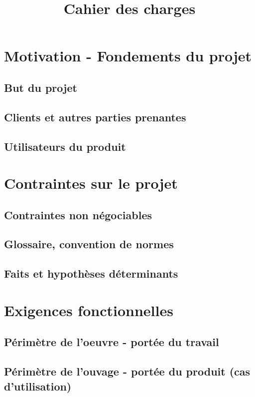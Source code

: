 

\title{\textbf{\Huge Cahier des charges}\vspace{-4ex}}


\maketitle

	\section{Motivation - Fondements du projet}
		\subsection{But du projet}
		\subsection{Clients et autres parties prenantes}
		\subsection{Utilisateurs du produit}
		
	\section{Contraintes sur le projet}
		\subsection{Contraintes non négociables}
		\subsection{Glossaire, convention de normes}
		\subsection{Faits et hypothèses déterminants}
		
	\section{Exigences fonctionnelles}
		\subsection{Périmètre de l'oeuvre - portée du travail}
		\subsection{Périmètre de l'ouvage - portée du produit (cas d'utilisation)}
